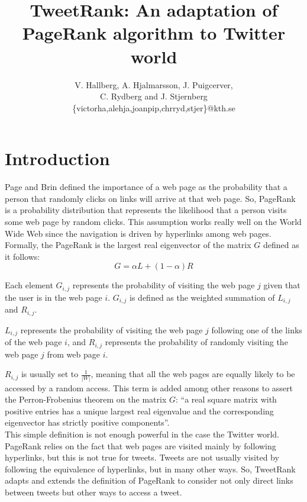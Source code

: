 \documentclass[12pt,a4paper]{article}
\author{V. Hallberg, A. Hjalmarsson, J. Puigcerver, \\C. Rydberg and J. Stjernberg\\
\footnotesize{\{victorha,alehja,joanpip,chrryd,stjer\}@kth.se}}
\title{TweetRank: An adaptation of PageRank algorithm to Twitter world}
\begin{document}
\maketitle
{}

\section{Introduction}
Page and Brin defined the importance of a web page as the probability that a person that randomly clicks on links will arrive at that web page. So, PageRank is a probability distribution that represents the likelihood that a person visits some web page by random clicks. This assumption works really well on the World Wide Web since the navigation is driven by hyperlinks among web pages. \\ 

Formally, the PageRank is the largest real eigenvector of the matrix $G$ defined as it follows:
\begin{equation}\label{eq:basic_pr}
G = \alpha L + (1-\alpha) R
\end{equation}

Each element $G_{i,j}$ represents the probability of visiting the web page $j$ given that the user is in the web page $i$. $G_{i,j}$ is defined as the weighted summation of $L_{i,j}$ and $R_{i,j}$.

$L_{i,j}$ represents the probability of visiting the web page $j$ following one of the links of the web page $i$, and $R_{i,j}$ represents the probability of randomly visiting the web page $j$ from web page $i$. 

$R_{i,j}$ is usually set to $\frac{1}{|W|}$, meaning that all the web pages are equally likely to be accessed by a random access. This term is added among other reasons to assert the Perron-Frobenius theorem on the matrix $G$: ``a real square matrix with positive entries has a unique largest real eigenvalue and the corresponding eigenvector has strictly positive components''. \\

This simple definition is not enough powerful in the case the Twitter world. PageRank relies on the fact that web pages are visited mainly by following hyperlinks, but this is not true for tweets. Tweets are not usually visited by following the equivalence of hyperlinks, but in many other ways. So, TweetRank adapts and extends the definition of PageRank to consider not only direct links between tweets but other ways to access a tweet.
\end{document}
